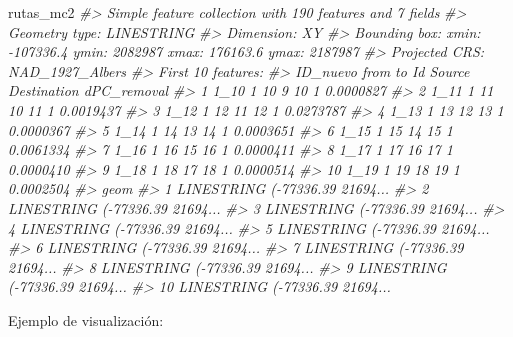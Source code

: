 \documentclass[
]{book}
\newenvironment{Shaded}{\begin{snugshade}}{\end{snugshade}}
\newcommand{\CommentTok}[1]{\textcolor[rgb]{0.56,0.35,0.01}{\textit{#1}}}
\newcommand{\NormalTok}[1]{#1}
\begin{document}
\begin{Shaded}
\begin{Highlighting}[]
\NormalTok{rutas\_mc2}
\CommentTok{\#\textgreater{} Simple feature collection with 190 features and 7 fields}
\CommentTok{\#\textgreater{} Geometry type: LINESTRING}
\CommentTok{\#\textgreater{} Dimension:     XY}
\CommentTok{\#\textgreater{} Bounding box:  xmin: {-}107336.4 ymin: 2082987 xmax: 176163.6 ymax: 2187987}
\CommentTok{\#\textgreater{} Projected CRS: NAD\_1927\_Albers}
\CommentTok{\#\textgreater{} First 10 features:}
\CommentTok{\#\textgreater{}    ID\_nuevo from to Id Source Destination dPC\_removal}
\CommentTok{\#\textgreater{} 1      1\_10    1 10  9     10           1   0.0000827}
\CommentTok{\#\textgreater{} 2      1\_11    1 11 10     11           1   0.0019437}
\CommentTok{\#\textgreater{} 3      1\_12    1 12 11     12           1   0.0273787}
\CommentTok{\#\textgreater{} 4      1\_13    1 13 12     13           1   0.0000367}
\CommentTok{\#\textgreater{} 5      1\_14    1 14 13     14           1   0.0003651}
\CommentTok{\#\textgreater{} 6      1\_15    1 15 14     15           1   0.0061334}
\CommentTok{\#\textgreater{} 7      1\_16    1 16 15     16           1   0.0000411}
\CommentTok{\#\textgreater{} 8      1\_17    1 17 16     17           1   0.0000410}
\CommentTok{\#\textgreater{} 9      1\_18    1 18 17     18           1   0.0000514}
\CommentTok{\#\textgreater{} 10     1\_19    1 19 18     19           1   0.0002504}
\CommentTok{\#\textgreater{}                              geom}
\CommentTok{\#\textgreater{} 1  LINESTRING ({-}77336.39 21694...}
\CommentTok{\#\textgreater{} 2  LINESTRING ({-}77336.39 21694...}
\CommentTok{\#\textgreater{} 3  LINESTRING ({-}77336.39 21694...}
\CommentTok{\#\textgreater{} 4  LINESTRING ({-}77336.39 21694...}
\CommentTok{\#\textgreater{} 5  LINESTRING ({-}77336.39 21694...}
\CommentTok{\#\textgreater{} 6  LINESTRING ({-}77336.39 21694...}
\CommentTok{\#\textgreater{} 7  LINESTRING ({-}77336.39 21694...}
\CommentTok{\#\textgreater{} 8  LINESTRING ({-}77336.39 21694...}
\CommentTok{\#\textgreater{} 9  LINESTRING ({-}77336.39 21694...}
\CommentTok{\#\textgreater{} 10 LINESTRING ({-}77336.39 21694...}
\end{Highlighting}
\end{Shaded}

Ejemplo de visualización:
\end{document}
